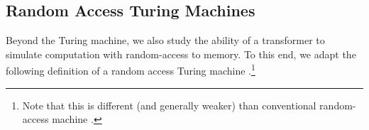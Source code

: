 \subsection{Random Access Turing Machines}


Beyond the Turing machine, we also study the ability of a transformer to simulate computation with random-access to memory. To this end, we adapt the following definition of a random access Turing machine \citep{immerman2012descriptive}.\footnote{Note that this is different (and generally weaker) than conventional random-access machine \citep{cook1973time}.}

